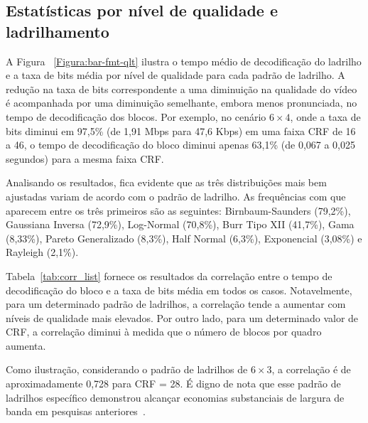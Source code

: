 \subsection{Estatísticas por nível de qualidade e ladrilhamento}

A Figura ~\ref{Figura:bar-fmt-qlt} ilustra o tempo médio de decodificação do ladrilho e a taxa de bits média por nível de qualidade para cada padrão de ladrilho. A redução na taxa de bits correspondente a uma diminuição na qualidade do vídeo é acompanhada por uma diminuição semelhante, embora menos pronunciada, no tempo de decodificação dos blocos. Por exemplo, no cenário $6 \times 4$, onde a taxa de bits diminui em 97,5\% (de 1,91 Mbps para 47,6 Kbps) em uma faixa CRF de 16 a 46, o tempo de decodificação do bloco diminui apenas 63,1\% (de 0,067 a 0,025 segundos) para a mesma faixa CRF.

Analisando os resultados, fica evidente que as três distribuições mais bem ajustadas variam de acordo com o padrão de ladrilho. As frequências com que aparecem entre os três primeiros são as seguintes: Birnbaum-Saunders (79,2\%), Gaussiana Inversa (72,9\%), Log-Normal (70,8\%), Burr Tipo XII (41,7\%), Gama (8,33\%), Pareto Generalizado (8,3\%), Half Normal (6,3\%), Exponencial (3,08\%) e Rayleigh (2,1\%).


Tabela~\ref{tab:corr_list} fornece os resultados da correlação entre o tempo de decodificação do bloco e a taxa de bits média em todos os casos. Notavelmente, para um determinado padrão de ladrilhos, a correlação tende a aumentar com níveis de qualidade mais elevados. Por outro lado, para um determinado valor de CRF, a correlação diminui à medida que o número de blocos por quadro aumenta.

Como ilustração, considerando o padrão de ladrilhos de $6 \times 3$, a correlação é de aproximadamente 0,728 para CRF = 28. É digno de nota que esse padrão de ladrilhos específico demonstrou alcançar economias substanciais de largura de banda em pesquisas anteriores~\cite{Graf2017}.

